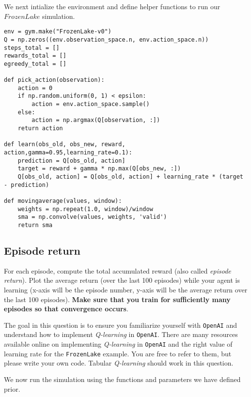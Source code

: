 \documentclass[12pt, letterpaper]{article}
\newcommand{\mybox}[1]{\par\noindent\colorbox{shadecolor}
{\parbox{\dimexpr\textwidth-2\fboxsep\relax}{#1}}}
\begin{document}
We next intialize the environment and define helper functions to run our $FrozenLake$ simulation.

\begin{mdframed}[backgroundcolor=shadecolor]
\begin{verbatim}
env = gym.make("FrozenLake-v0")
Q = np.zeros((env.observation_space.n, env.action_space.n))
steps_total = []
rewards_total = []
egreedy_total = []

def pick_action(observation):
    action = 0
    if np.random.uniform(0, 1) < epsilon:
        action = env.action_space.sample()
    else:
        action = np.argmax(Q[observation, :])
    return action

def learn(obs_old, obs_new, reward, action,gamma=0.95,learning_rate=0.1):
    prediction = Q[obs_old, action]
    target = reward + gamma * np.max(Q[obs_new, :])
    Q[obs_old, action] = Q[obs_old, action] + learning_rate * (target - prediction)

def movingaverage(values, window):    
    weights = np.repeat(1.0, window)/window
    sma = np.convolve(values, weights, 'valid')
    return sma
\end{verbatim}
\end{mdframed}

\subsection{Episode return}
\mybox{For each episode, compute the total accumulated reward (also called \textit{episode return}). Plot the average return (over the last 100 episodes) while your agent is learning (x-axis will be the episode number, y-axis will be the average return over the last 100 episodes). \textbf{Make sure that you train for sufficiently many episodes so that convergence occurs}.

The goal in this question is to ensure you familiarize yourself with \texttt{OpenAI} and understand how to implement \textit{Q-learning} in \texttt{OpenAI}. 
There are many resources available online on implementing \textit{Q-learning} in \texttt{OpenAI} and the right value of learning rate for the \texttt{FrozenLake} example.
You are free to refer to them, but please write your own code. 
Tabular \textit{Q-learning} should work in this question.}

We now run the simulation using the functions and parameters we have defined prior.
\end{document}
